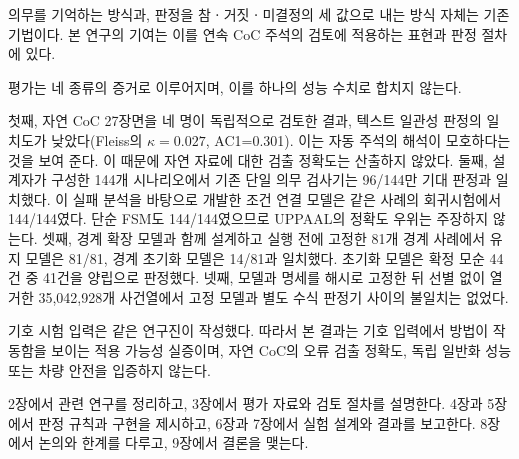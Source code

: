 \begin{revision}
의무를 기억하는 방식과, 판정을 참ㆍ거짓ㆍ미결정의 세 값으로 내는 방식 자체는 기존 기법이다. 본 연구의 기여는 이를 연속 CoC 주석의 검토에 적용하는 표현과 판정 절차에 있다.

평가는 네 종류의 증거로 이루어지며, 이를 하나의 성능 수치로 합치지 않는다.

첫째, 자연 CoC 27장면을 네 명이 독립적으로 검토한 결과, 텍스트 일관성 판정의 일치도가 낮았다(Fleiss의 $\kappa=0.027$, AC1=0.301). 이는 자동 주석의 해석이 모호하다는 것을 보여 준다. 이 때문에 자연 자료에 대한 검출 정확도는 산출하지 않았다. 둘째, 설계자가 구성한 144개 시나리오에서 기존 단일 의무 검사기는 96/144만 기대 판정과 일치했다. 이 실패 분석을 바탕으로 개발한 조건 연결 모델은 같은 사례의 회귀시험에서 144/144였다. 단순 FSM도 144/144였으므로 UPPAAL의 정확도 우위는 주장하지 않는다. 셋째, 경계 확장 모델과 함께 설계하고 실행 전에 고정한 81개 경계 사례에서 유지 모델은 81/81, 경계 초기화 모델은 14/81과 일치했다. 초기화 모델은 확정 모순 44건 중 41건을 양립으로 판정했다. 넷째, 모델과 명세를 해시로 고정한 뒤 선별 없이 열거한 35,042,928개 사건열에서 고정 모델과 별도 수식 판정기 사이의 불일치는 없었다.

기호 시험 입력은 같은 연구진이 작성했다. 따라서 본 결과는 기호 입력에서 방법이 작동함을 보이는 적용 가능성 실증이며, 자연 CoC의 오류 검출 정확도, 독립 일반화 성능 또는 차량 안전을 입증하지 않는다.

2장에서 관련 연구를 정리하고, 3장에서 평가 자료와 검토 절차를 설명한다. 4장과 5장에서 판정 규칙과 구현을 제시하고, 6장과 7장에서 실험 설계와 결과를 보고한다. 8장에서 논의와 한계를 다루고, 9장에서 결론을 맺는다.
\end{revision}
